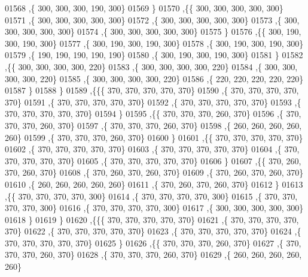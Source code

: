 \begin{DoxyCode}
01568    ,\{   300,   300,   300,   190,   300\}
01569    \}
01570   ,\{\{   300,   300,   300,   300,   300\}
01571    ,\{   300,   300,   300,   300,   300\}
01572    ,\{   300,   300,   300,   300,   300\}
01573    ,\{   300,   300,   300,   300,   300\}
01574    ,\{   300,   300,   300,   300,   300\}
01575    \}
01576   ,\{\{   300,   190,   300,   190,   300\}
01577    ,\{   300,   190,   300,   190,   300\}
01578    ,\{   300,   190,   300,   190,   300\}
01579    ,\{   190,   190,   190,   190,   190\}
01580    ,\{   300,   190,   300,   190,   300\}
01581    \}
01582   ,\{\{   300,   300,   300,   300,   220\}
01583    ,\{   300,   300,   300,   300,   220\}
01584    ,\{   300,   300,   300,   300,   220\}
01585    ,\{   300,   300,   300,   300,   220\}
01586    ,\{   220,   220,   220,   220,   220\}
01587    \}
01588   \}
01589  ,\{\{\{   370,   370,   370,   370,   370\}
01590    ,\{   370,   370,   370,   370,   370\}
01591    ,\{   370,   370,   370,   370,   370\}
01592    ,\{   370,   370,   370,   370,   370\}
01593    ,\{   370,   370,   370,   370,   370\}
01594    \}
01595   ,\{\{   370,   370,   370,   260,   370\}
01596    ,\{   370,   370,   370,   260,   370\}
01597    ,\{   370,   370,   370,   260,   370\}
01598    ,\{   260,   260,   260,   260,   260\}
01599    ,\{   370,   370,   370,   260,   370\}
01600    \}
01601   ,\{\{   370,   370,   370,   370,   370\}
01602    ,\{   370,   370,   370,   370,   370\}
01603    ,\{   370,   370,   370,   370,   370\}
01604    ,\{   370,   370,   370,   370,   370\}
01605    ,\{   370,   370,   370,   370,   370\}
01606    \}
01607   ,\{\{   370,   260,   370,   260,   370\}
01608    ,\{   370,   260,   370,   260,   370\}
01609    ,\{   370,   260,   370,   260,   370\}
01610    ,\{   260,   260,   260,   260,   260\}
01611    ,\{   370,   260,   370,   260,   370\}
01612    \}
01613   ,\{\{   370,   370,   370,   370,   300\}
01614    ,\{   370,   370,   370,   370,   300\}
01615    ,\{   370,   370,   370,   370,   300\}
01616    ,\{   370,   370,   370,   370,   300\}
01617    ,\{   300,   300,   300,   300,   300\}
01618    \}
01619   \}
01620  ,\{\{\{   370,   370,   370,   370,   370\}
01621    ,\{   370,   370,   370,   370,   370\}
01622    ,\{   370,   370,   370,   370,   370\}
01623    ,\{   370,   370,   370,   370,   370\}
01624    ,\{   370,   370,   370,   370,   370\}
01625    \}
01626   ,\{\{   370,   370,   370,   260,   370\}
01627    ,\{   370,   370,   370,   260,   370\}
01628    ,\{   370,   370,   370,   260,   370\}
01629    ,\{   260,   260,   260,   260,   260\}

\end{DoxyCode}
